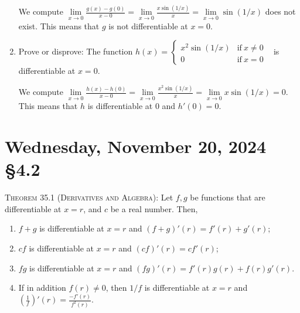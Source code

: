 \documentclass[12pt]{amsart}
\def\We{Wednesday}
\numberwithin{equation}{section}
\theoremstyle{plain} %
\newcommand{\Nov}[3]{\section{#2, November #1, 2024 \quad \S#3}}
\theoremstyle{definition}
\theoremstyle{remark}
\begin{document}
\begin{enumerate}
\begin{framed}
We compute $\lim\limits_{x\to 0} \frac{g(x) - g(0)}{x-0}= \lim\limits_{x\to 0} \frac{x \sin(1/x)}{x} = \lim\limits_{x\to 0} \sin(1/x)$ does not exist. This means that $g$ is not differentiable at $x=0$.
\end{framed}


\item Prove or disprove: The function $h(x) = \begin{cases} x^2 \sin(1/x) &\text{if} \ x \neq 0 \\ 0 & \text{if} \ x=0\end{cases}$ \  is differentiable at $x=0$.

\begin{framed}
We compute $\lim\limits_{x\to 0} \frac{h(x) - h(0)}{x-0}= \lim\limits_{x\to 0} \frac{x^2 \sin(1/x)}{x} = \lim\limits_{x\to 0} x\sin(1/x)=0$. This means that $h$ is differentiable at $0$ and $h'(0)=0$. 
\end{framed}

 \end{enumerate}
 
 \newpage
 \Nov{20}{\We}{4.2}
 \begin{framed}
  \noindent \textsc{Theorem 35.1 (Derivatives and Algebra):}   Let $f,g$ be functions that are differentiable at $x=r$, and $c$ be a real number. Then,
 \begin{enumerate}
 \item $f+g$ is differentiable at $x=r$ and $(f+g)'(r) = f'(r) + g'(r)$;
 \item $cf$ is differentiable at $x=r$ and $(cf)'(r) = c f'(r)$;
 \item $fg$ is differentiable at $x=r$ and $(fg)'(r) = f'(r) g(r) + f(r) g'(r)$.
 \item If in addition $f(r)\neq 0$, then $1/f$ is differentiable at $x=r$ and $\displaystyle \left(\frac{1}{f}\right)'\!\!(r)= \frac{-f'(r)}{f^2(r)}$.
    \end{enumerate}
 \end{framed}


\
\end{document}
